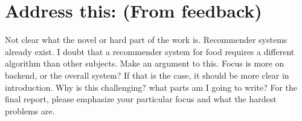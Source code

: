 \section{Address this: (From feedback)}
Not clear what the novel or hard part of the work is. Recommender systems already exist. I doubt that a recommender system for food requires a different algorithm than other subjects. Make an argument to this.
Focus is more on backend, or the overall system? If that is the case, it should be more clear in introduction. Why is this challenging? 
what parts am I going to write?
For the final report, please emphasize your particular focus and what the hardest problems are. 